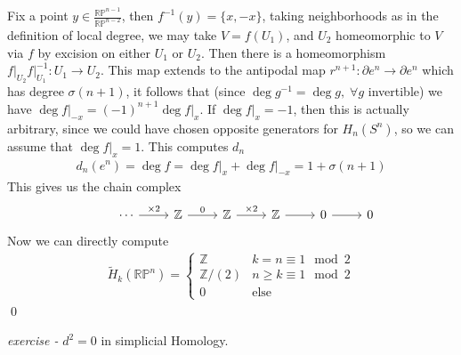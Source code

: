 \documentclass[11pt]{article}
\theoremstyle{definition}
\newcommand{\set}[1]{\{#1\}}
\begin{document}
    Fix a point \(y \in \frac{\mathbb{RP}^{n-1}}{\mathbb{RP}^{n-2}}\), then \(f^{-1}(y) = \set{x,-x}\), taking neighborhoods as in the definition of local degree, we may take \(V = f(U_1)\), and \(U_2\) homeomorphic to \(V\) via \(f\) by excision on either \(U_1\) or \(U_2\). Then there is a homeomorphism \(f\vert_{U_2}f\vert_{U_1}^{-1}: U_1 \to U_2\). This map extends to the antipodal map \(r^{n+1}: \partial e^n \to \partial e^n\) which has degree \(\sigma(n+1)\), it follows that (since \(\deg g^{-1} = \deg g,\; \forall g\) invertible) we have \(\deg f \vert_{-x} = (-1)^{n+1} \deg f \vert_x\). If \(\deg f \vert_x = -1\), then this is actually arbitrary, since we could have chosen opposite generators for \(H_n(S^n)\), so we can assume that \(\deg f \vert_x = 1\). This computes \(d_n\)
    \begin{align*}
        d_n(e^n) = \deg f = \deg f \vert_x + \deg f \vert_{-x} = 1 + \sigma(n+1)
    \end{align*}
    This gives us the chain complex
    \begin{equation*}
        \begin{tikzcd}
            &\cdots \arrow[r,"{\times 2}"]& \mathbb{Z} \arrow[r,"{0}"] &\mathbb{Z} \arrow[r,"{\times 2}"] &\mathbb{Z} \arrow[r] & 0 \arrow[r]& 0
        \end{tikzcd}
    \end{equation*}
    Now we can directly compute
    \begin{align*}
        \tilde{H}_k(\mathbb{RP}^n) = \begin{cases}
            \mathbb{Z} & k=n \equiv 1\!\!\!\mod{2} \\
            \mathbb{Z}/(2) &n \geq k \equiv 1\!\!\!\mod{2}\\
            0 & \text{else}
        \end{cases}
    \end{align*}
    \qed


    \emph{exercise - }\label{HEx18} \(d^2 = 0\) in simplicial Homology.
\end{document}
